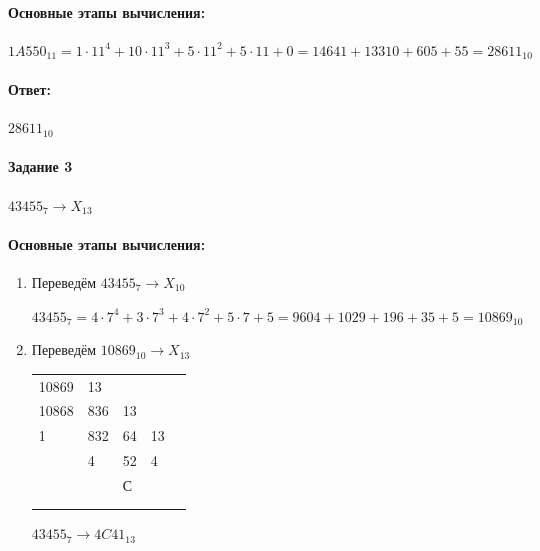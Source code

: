 \documentclass[12pt,onecolumn]{article}
\begin{document}
\paragraph{Основные этапы вычисления:}
\hfill \break
\hfill \break
$1A550_{11}=1\cdot 11^4 + 10\cdot 11^3 +5\cdot 11^2 + 5\cdot11+0=14641+13310+605+55=28611_{10}$

\paragraph{Ответ:}
$28611_{10}$

\paragraph{Задание 3}
$43455_{7} \rightarrow X_{13}$

\paragraph{Основные этапы вычисления:}

\begin{enumerate}
\item Переведём $43455_{7} \rightarrow X_{10}$

$43455_{7} = 4\cdot7^4 + 3\cdot 7^3 + 4\cdot 7^2 + 5\cdot7+5=9604+1029+196+35+5=10869_{10}$

\item Переведём $10869_{10} \rightarrow X_{13}$

\FloatBarrier
\begin{table}
\centering
\begin{tabular}{lllll}
\multicolumn{1}{l|}{10869} & 13                       &                         &    &   \\ 
\cline{2-2}
\multicolumn{1}{l|}{10868} & \multicolumn{1}{l|}{836} & 13                      &    &   \\ 
\cline{1-1}\cline{3-3}
1                          & \multicolumn{1}{l|}{832} & \multicolumn{1}{l|}{64} & 13 &   \\ 
\cline{2-2}\cline{4-4}
                           & 4                        & \multicolumn{1}{l|}{52} & 4  &   \\ 
\cline{3-3}
                           &                          & С                       &    &   \\
                           &                          &                         &    &   \\
                           &                          &                         &    &  
\end{tabular}
\end{table}
\FloatBarrier
$43455_{7} \rightarrow 4C41_{13}$
\end{enumerate}
\end{document}
